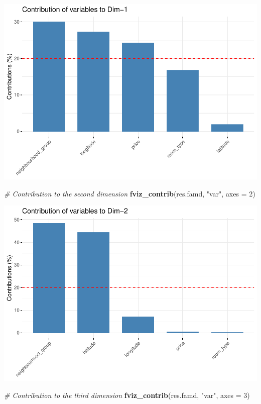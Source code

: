 \documentclass[
]{article}
\newenvironment{Shaded}{\begin{snugshade}}{\end{snugshade}}
\newcommand{\CommentTok}[1]{\textcolor[rgb]{0.56,0.35,0.01}{\textit{#1}}}
\newcommand{\DataTypeTok}[1]{\textcolor[rgb]{0.13,0.29,0.53}{#1}}
\newcommand{\DecValTok}[1]{\textcolor[rgb]{0.00,0.00,0.81}{#1}}
\newcommand{\KeywordTok}[1]{\textcolor[rgb]{0.13,0.29,0.53}{\textbf{#1}}}
\newcommand{\NormalTok}[1]{#1}
\newcommand{\StringTok}[1]{\textcolor[rgb]{0.31,0.60,0.02}{#1}}
\begin{document}
\includegraphics{project-code_files/figure-latex/unnamed-chunk-38-2.pdf}

\begin{Shaded}
\begin{Highlighting}[]
\CommentTok{# Contribution to the second dimension}
\KeywordTok{fviz_contrib}\NormalTok{(res.famd, }\StringTok{"var"}\NormalTok{, }\DataTypeTok{axes =} \DecValTok{2}\NormalTok{)}
\end{Highlighting}
\end{Shaded}

\includegraphics{project-code_files/figure-latex/unnamed-chunk-38-3.pdf}

\begin{Shaded}
\begin{Highlighting}[]
\CommentTok{# Contribution to the third dimension}
\KeywordTok{fviz_contrib}\NormalTok{(res.famd, }\StringTok{"var"}\NormalTok{, }\DataTypeTok{axes =} \DecValTok{3}\NormalTok{)}
\end{Highlighting}
\end{Shaded}
\end{document}
